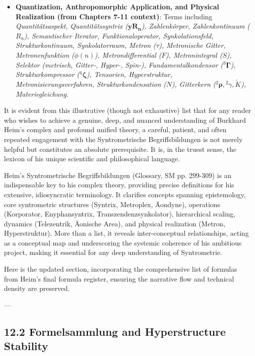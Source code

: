 \documentclass[12pt]{article}
\begin{document}
\begin{itemize}
\begin{itemize}
        \item \textbf{Quantization, Anthropomorphic Application, and Physical Realization (from Chapters 7-11 context)}: Terms including \textit{Quantitätsaspekt, Quantitätssyntrix (\( \mathbf{yR_n} \)), Zahlenkörper, Zahlenkontinuum (\(R_n\)), Semantischer Iterator, Funktionaloperator, Synkolationsfeld, Strukturkontinuum, Synkolatorraum, Metron (\(\tau\)), Metronische Gitter, Metronenfunktion (\(\phi(n)\)), Metrondifferential (\( F \)), Metronintegral (\( S \)), Selektor (metrisch, Gitter-, Hyper-, Spin-), Fundamentalkondensor (\( {}^3\bm{\Gamma} \)), Strukturkompressor (\( {}^4\bm{\zeta} \)), Tensorien, Hyperstruktur, Metronisierungsverfahren, Strukturkondensation (\(N\)), Gitterkern (\( {}^2\bm{\rho}, {}^2\gamma, \tilde{K} \)), Materiegleichung.}
    \end{itemize}
    It is evident from this illustrative (though not exhaustive) list that for any reader who wishes to achieve a genuine, deep, and nuanced understanding of Burkhard Heim's complex and profound unified theory, a careful, patient, and often repeated engagement with the Syntrometrische Begriffsbildungen is not merely helpful but constitutes an absolute prerequisite. It is, in the truest sense, the lexicon of his unique scientific and philosophical language.
\end{itemize}

Heim's Syntrometrische Begriffsbildungen (Glossary, SM pp. 299-309) is an indispensable key to his complex theory, providing precise definitions for his extensive, idiosyncratic terminology. It clarifies concepts spanning epistemology, core syntrometric structures (Syntrix, Metroplex, Äondyne), operations (Korporator, Enyphansyntrix, Transzendenzsynkolator), hierarchical scaling, dynamics (Telezentrik, Äonische Area), and physical realization (Metron, Hyperstruktur). More than a list, it reveals inter-conceptual relationships, acting as a conceptual map and underscoring the systemic coherence of his ambitious project, making it essential for any deep understanding of Syntrometrie.

Here is the updated section, incorporating the comprehensive list of formulas from Heim’s final formula register, ensuring the narrative flow and technical density are preserved.

---

\subsection{12.2 Formelsammlung and Hyperstructure Stability}
\label{sec:formelsammlung}
\end{document}
